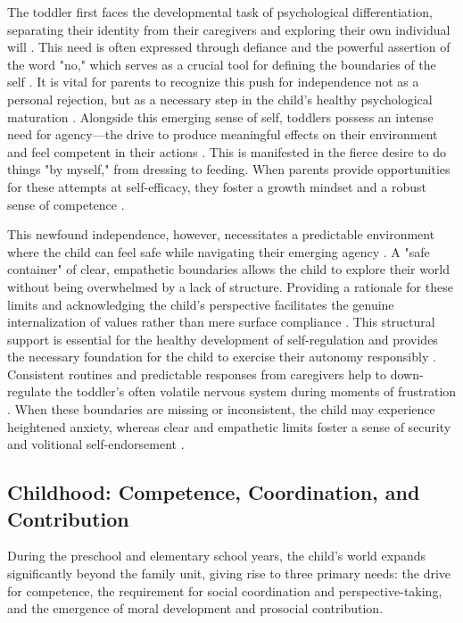 The toddler first faces the developmental task of psychological differentiation, separating their identity from their caregivers and exploring their own individual will \citep{erikson1950}. 
This need is often expressed through defiance and the powerful assertion of the word "no," which serves as a crucial tool for defining the boundaries of the self \citep{siegel2011}. 
It is vital for parents to recognize this push for independence not as a personal rejection, but as a necessary step in the child's healthy psychological maturation \citep{thomas1977}. 
Alongside this emerging sense of self, toddlers possess an intense need for agency---the drive to produce meaningful effects on their environment and feel competent in their actions \citep{white1959}. 
This is manifested in the fierce desire to do things "by myself," from dressing to feeding. 
When parents provide opportunities for these attempts at self-efficacy, they foster a growth mindset and a robust sense of competence \citep{dweck2006}.

This newfound independence, however, necessitates a predictable environment where the child can feel safe while navigating their emerging agency \citep{kohn2005}. 
A "safe container" of clear, empathetic boundaries allows the child to explore their world without being overwhelmed by a lack of structure. 
Providing a rationale for these limits and acknowledging the child's perspective facilitates the genuine internalization of values rather than mere surface compliance \citep{joussemet2008}. 
This structural support is essential for the healthy development of self-regulation and provides the necessary foundation for the child to exercise their autonomy responsibly \citep{grolnick1989}. 
Consistent routines and predictable responses from caregivers help to down-regulate the toddler's often volatile nervous system during moments of frustration \citep{porges2011}. 
When these boundaries are missing or inconsistent, the child may experience heightened anxiety, whereas clear and empathetic limits foster a sense of security and volitional self-endorsement \citep{ryan2017}.

\subsection{Childhood: Competence, Coordination, and Contribution}

During the preschool and elementary school years, the child's world expands significantly beyond the family unit, giving rise to three primary needs: the drive for competence, the requirement for social coordination and perspective-taking, and the emergence of moral development and prosocial contribution.

